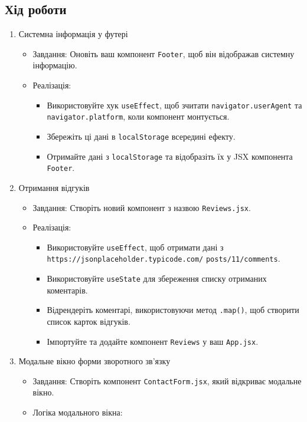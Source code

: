 \documentclass[12pt, a4paper]{article}
\begin{document}
\subsection{Хід роботи}
\begin{enumerate}
	\item Системна інформація у футері
		\begin{itemize}
			\item Завдання: Оновіть ваш компонент \verb|Footer|, щоб він відображав системну інформацію.
			\item Реалізація:
				\begin{itemize}
					\item Використовуйте хук \verb|useEffect|, щоб зчитати \verb|navigator.userAgent| та \verb|navigator.platform|, коли компонент монтується.
					\item Збережіть ці дані в \verb|localStorage| всередині ефекту.
					\item Отримайте дані з \verb|localStorage| та відобразіть їх у JSX компонента \verb|Footer|.
				\end{itemize}
		\end{itemize}
	\item Отримання відгуків
		\begin{itemize}
			\item Завдання: Створіть новий компонент з назвою \verb|Reviews.jsx|.
			\item Реалізація:
				\begin{itemize}
					\item Використовуйте \verb|useEffect|, щоб отримати дані з \verb|https://jsonplaceholder.typicode.com/|
					\verb|posts/11/comments|.
					\item Використовуйте \verb|useState| для збереження списку отриманих коментарів.
					\item Відрендеріть коментарі, використовуючи метод \verb|.map()|, щоб створити список карток відгуків.
					\item Імпортуйте та додайте компонент \verb|Reviews| у ваш \verb|App.jsx|.
				\end{itemize}
		\end{itemize}
	\item Модальне вікно форми зворотного зв'язку
		\begin{itemize}
			\item Завдання: Створіть компонент \verb|ContactForm.jsx|, який відкриває модальне вікно.
			\item Логіка модального вікна: 
				\begin{itemize}

\end{itemize}
\end{itemize}
\end{enumerate}
\end{document}
